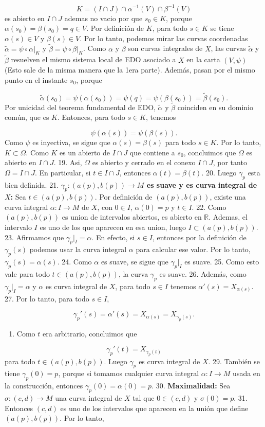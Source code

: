 \begin{bookproof}{}
\[
K=(I\cap J)\cap\alpha^{-1}(V)\cap\beta^{-1}(V)
\]
es abierto en $I\cap J$ ademas no vacio por que $s_0\in K$, porque $\alpha(s_0)=\beta(s_0)=q\in V$. Por definición de $K$, para todo $s\in K$ se tiene $\alpha(s)\in V$ y $\beta(s)\in V$. Por lo tanto, podemos mirar las curvas coordenadas $\widetilde\alpha=\psi\circ\alpha|_K$ y $\widetilde\beta=\psi\circ\beta|_K$. Como $\alpha$ y $\beta$ son curvas integrales de $X$, las curvas $\widetilde\alpha$ y $\widetilde\beta$ resuelven el mismo sistema local de EDO asociado a $X$ en la carta $(V,\psi)$ (Esto sale de la misma manera que la 1era parte). Además, pasan por el mismo punto en el instante $s_0$, porque

\[
\widetilde\alpha(s_0)=\psi(\alpha(s_0))=\psi(q)=\psi(\beta(s_0))=\widetilde\beta(s_0).
\]
Por unicidad del teorema fundamental de EDO, $\widetilde\alpha$ y $\widetilde\beta$ coinciden en su dominio común, que es $K$. Entonces, para todo $s\in K$, tenemos

\[
\psi(\alpha(s))=\psi(\beta(s)).
\]
Como $\psi$ es inyectiva, se sigue que $\alpha(s)=\beta(s)$ para todo $s\in K$. Por lo tanto, $K\subset\Omega$. Como $K$ es un abierto de $I\cap J$ que contiene a $s_0$, concluimos que $\Omega$ es abierto en $I\cap J$. 19. Asi, $\Omega$ es abierto y cerrado en el conexo $I\cap J$, por tanto $\Omega=I\cap J$. En particular, si $t\in I\cap J$, entonces $\alpha(t)=\beta(t)$. 20. Luego $\gamma_p$ esta bien definida. 21. \textbf{$\gamma_p:(a(p),b(p))\to M$ es suave y es curva integral de $X$:} Sea $t\in(a(p),b(p))$. Por definición de $(a(p),b(p))$, existe una curva integral $\alpha:I\to M$ de $X$, con $0\in I$, $\alpha(0)=p$ y $t\in I$. 22. Como $(a(p),b(p))$ es union de intervalos abiertos, es abierto en $\mathbb R$. Ademas, el intervalo $I$ es uno de los que aparecen en esa union, luego $I\subset(a(p),b(p))$. 23. Afirmamos que $\gamma_p|_I=\alpha$. En efecto, si $s\in I$, entonces por la definición de $\gamma_p(s)$ podemos usar la curva integral $\alpha$ para calcular ese valor. Por lo tanto, $\gamma_p(s)=\alpha(s)$. 24. Como $\alpha$ es suave, se sigue que $\gamma_p|_I$ es suave. 25. Como esto vale para todo $t\in(a(p),b(p))$, la curva $\gamma_p$ es suave. 26. Además, como $\gamma_p|_I=\alpha$ y $\alpha$ es curva integral de $X$, para todo $s\in I$ tenemos $\alpha'(s)=X_{\alpha(s)}$. 27. Por lo tanto, para todo $s\in I$,

\[
\gamma_p'(s)=\alpha'(s)=X_{\alpha(s)}=X_{\gamma_p(s)}.
\]
\begin{enumerate}[start=28]
\item Como $t$ era arbitrario, concluimos que
\end{enumerate}
\[
\gamma_p'(t)=X_{\gamma_p(t)}
\]
para todo $t\in(a(p),b(p))$. Luego $\gamma_p$ es curva integral de $X$. 29. También se tiene $\gamma_p(0)=p$, porque si tomamos cualquier curva integral $\alpha:I\to M$ usada en la construcción, entonces $\gamma_p(0)=\alpha(0)=p$. 30. \textbf{Maximalidad:} Sea $\sigma:(c,d)\to M$ una curva integral de $X$ tal que $0\in(c,d)$ y $\sigma(0)=p$. 31. Entonces $(c,d)$ es uno de los intervalos que aparecen en la unión que define $(a(p),b(p))$. Por lo tanto,


\end{bookproof}

